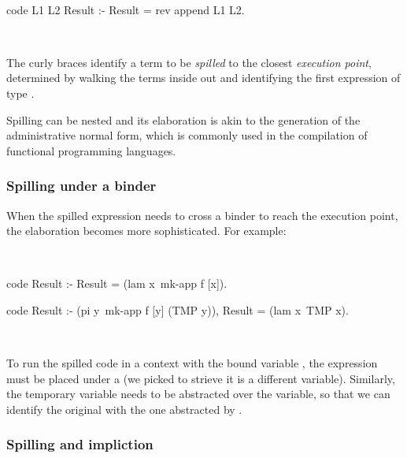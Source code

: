 \documentclass[a4paper, 11pt]{book}
\newenvironment{elpicode}
  {\VerbatimEnvironment~\\\begin{elpibox}\begin{xelpicode}}{\end{xelpicode}
\end{elpibox}\\}
\begin{document}
\begin{elpicode}
code L1 L2 Result :- Result = {rev {append L1 L2}}.
\end{elpicode}

The curly braces identify a term to be \emph{spilled} to the closest
\emph{execution point}, determined by walking the terms inside out
and identifying the first expression of type .

Spilling can be nested and its elaboration is akin to the generation of the
administrative normal form, which is commonly used in 
the compilation of functional programming
languages.

\subsubsection{Spilling under a binder}


When the spilled expression needs to cross a binder to reach the execution
point, the elaboration becomes more sophisticated. For example:

\begin{elpicode}
code Result :- Result = (lam x\ {mk-app f [x]}).

code Result :- (pi y\ mk-app f [y] (TMP y)), Result = (lam x\ TMP x).
\end{elpicode}

\noindent
To run the spilled code in a context with the bound variable , the
expression must be placed under a  (we picked  to strieve it
is a different variable). Similarly, the temporary
variable  needs to be abstracted over the variable, so that we can identify
the original  with the one abstracted by .



\subsubsection{Spilling and impliction}
\end{document}
